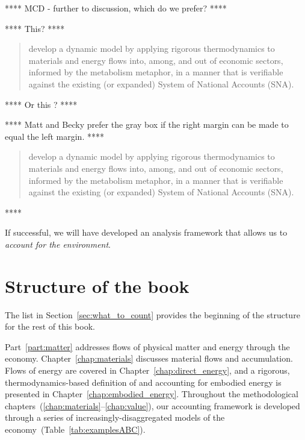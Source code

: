 **** MCD - further to discussion,
which do we prefer? ****

**** This? ****

\begin{framed}
	\begin{quote}
	\begin{normalsize}
		develop a dynamic model 
		by applying rigorous thermodynamics 
		to materials and energy flows into, among, 
		and out of economic sectors,
		informed by the metabolism metaphor,
		in a manner that is verifiable against 
		the existing (or expanded) 
		System of National Accounts (SNA).
	\end{normalsize}
	\end{quote}
\end{framed}

**** Or this ? ****

**** Matt and Becky prefer the gray box 
if the right margin can be made to equal the left margin. ****

\begin{svgraybox}
	\begin{quote}
	\begin{normalsize}
		develop a dynamic model 
		by applying rigorous thermodynamics 
		to materials and energy flows into, among, 
		and out of economic sectors,
		informed by the metabolism metaphor,
		in a manner that is verifiable against 
		the existing (or expanded) 
		System of National Accounts (SNA).
	\end{normalsize}
	\end{quote}
\end{svgraybox}

****

\noindent{}If successful, we will have developed an analysis framework 
that allows us to \emph{account for the environment}.


\section{Structure of the book}
\label{sec:structure}

The list in Section~\ref{sec:what_to_count} 
provides the beginning of the structure for the rest of this book.

Part~\ref{part:matter} addresses flows of physical matter and energy
through the economy.
Chapter~\ref{chap:materials} discusses material flows and accumulation.
Flows of energy are covered in Chapter~\ref{chap:direct_energy}, 
and a rigorous, thermodynamics-based definition of and accounting for 
embodied energy is presented in Chapter~\ref{chap:embodied_energy}.
Throughout the methodological chapters~(\ref{chap:materials}--\ref{chap:value}),
our accounting framework is developed
through a series of increasingly-disaggregated
models of the economy~(Table~\ref{tab:examplesABC}).

